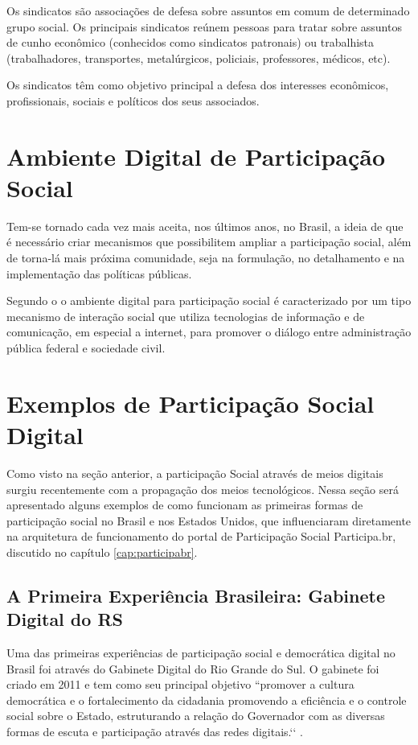 Os sindicatos são associações de defesa sobre assuntos em comum de determinado grupo social. Os principais sindicatos reúnem pessoas para tratar sobre assuntos de cunho econômico (conhecidos como sindicatos patronais) ou trabalhista (trabalhadores, transportes, metalúrgicos, policiais, professores, médicos, etc).

Os sindicatos têm como objetivo principal a defesa dos interesses econômicos, profissionais, sociais e políticos dos seus associados. 

\section{Ambiente Digital de Participação Social}

Tem-se tornado cada vez mais aceita, nos últimos anos, no Brasil, a ideia de que é necessário criar mecanismos que possibilitem ampliar a participação social, além de torna-lá mais próxima comunidade, seja na formulação, no detalhamento e na implementação das políticas públicas.

Segundo o \cite{decreto8243} o ambiente digital para participação social é caracterizado por um tipo mecanismo de interação social que utiliza tecnologias de informação e de comunicação, em especial a internet, para promover o diálogo entre administração pública federal e sociedade civil. 

\section{Exemplos de Participação Social Digital}

Como visto na seção anterior, a participação Social através de meios digitais surgiu recentemente com a propagação dos meios tecnológicos. Nessa seção será apresentado alguns exemplos de como funcionam as primeiras formas de participação social no Brasil e nos Estados Unidos, que influenciaram diretamente na arquitetura de funcionamento do portal de Participação Social Participa.br, discutido no capítulo \ref{cap:participabr}.

\subsection{A Primeira Experiência Brasileira: Gabinete Digital do RS}

Uma das primeiras experiências de participação social e democrática digital no Brasil foi através do Gabinete Digital do Rio Grande do Sul. O gabinete foi criado em 2011 e tem como seu principal objetivo ``promover a cultura democrática e o fortalecimento da cidadania promovendo a eficiência e o controle social sobre o Estado, estruturando a relação do Governador com as diversas formas de escuta e participação através das redes digitais.‘‘ \cite{gabinete2012participacao}.

